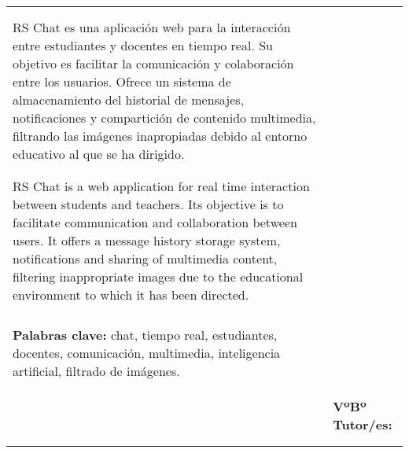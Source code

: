 \begin{table}[ht]
\begin{tabularx}{\textwidth}{|X|X|}
		\hline

		\\[-6.6ex]
		\begin{flushleft}
			\textbf{RESUMEN:} \\
			{RS Chat es una aplicación web para la interacción entre estudiantes y docentes
			en tiempo real. Su objetivo es facilitar la comunicación y colaboración
			entre los usuarios. Ofrece un sistema de almacenamiento del historial
			de mensajes, notificaciones y compartición de contenido multimedia, filtrando
			las imágenes inapropiadas debido al entorno educativo al que se ha dirigido.}
		\end{flushleft}
		\\[-1.5ex]

		\hline

		\\[-6.6ex]
		\begin{flushleft}
			\textbf{ABSTRACT:} \\
			{RS Chat is a web application for real time interaction between students and
			teachers. Its objective is to facilitate communication and collaboration
			between users. It offers a message history storage system, notifications and
			sharing of multimedia content, filtering inappropriate images due to the
			educational environment to which it has been directed.}
		\end{flushleft}
		\\[-1.5ex]

		\hline

		\\[-6.8ex]
		\begin{flushleft}
			\textbf{Palabras clave:} chat, tiempo real, estudiantes, docentes, comunicación, multimedia, inteligencia
			artificial, filtrado de imágenes.
		\end{flushleft}
		\\[-3ex]

		\hline

		\begin{tabular}{p{}|p{}}
			\textbf{Firma del alumno:}
			&
			\textbf{VºBº Tutor/es:} \\

			{} & {} \\[10ex]
		\end{tabular}
		\\

		\hline
	\end{tabularx}
\end{table}

